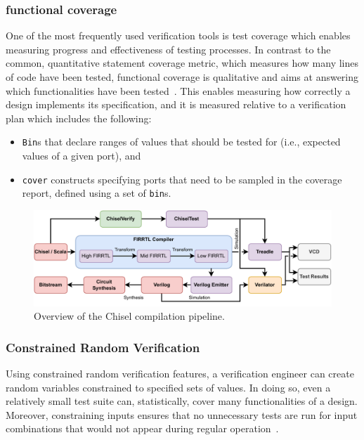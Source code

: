\documentclass[conference]{IEEEtran}
\begin{document}
\subsubsection{functional coverage}
One of the most frequently used verification tools is test coverage which enables measuring 
progress and effectiveness of testing processes. In contrast to the common, quantitative statement 
coverage metric, which measures how many lines of code have been tested, functional coverage is 
qualitative and aims at answering which functionalities have been 
tested~\cite{spear2008systemverilog}. This enables measuring how correctly a design implements its 
specification, and it is measured relative to a verification plan which includes the following:

\begin{itemize}
  \item \texttt{Bin}s that declare ranges of values that should be tested for (i.e., expected values of a given port), and 
  \item \texttt{cover} constructs specifying ports that need to be sampled in the coverage report, defined using a set of \texttt{bin}s.
\end{itemize}

\begin{figure}
  \centering
    \includegraphics[width=0.8\linewidth]{Chisel_FIRRTL_VERILOG.pdf}
    \caption{Overview of the Chisel compilation pipeline.}
\label{fig:chisel-pipe}
\end{figure}

\subsubsection{Constrained Random Verification}
Using constrained random verification features, a verification engineer can create random variables constrained to 
specified sets of values. In doing so, even a relatively small test suite can, statistically, 
cover many functionalities of a design. Moreover, constraining inputs ensures that no 
unnecessary tests are run for input combinations that would not appear during regular 
operation~\cite{MehtaCRV2018}.
\end{document}
